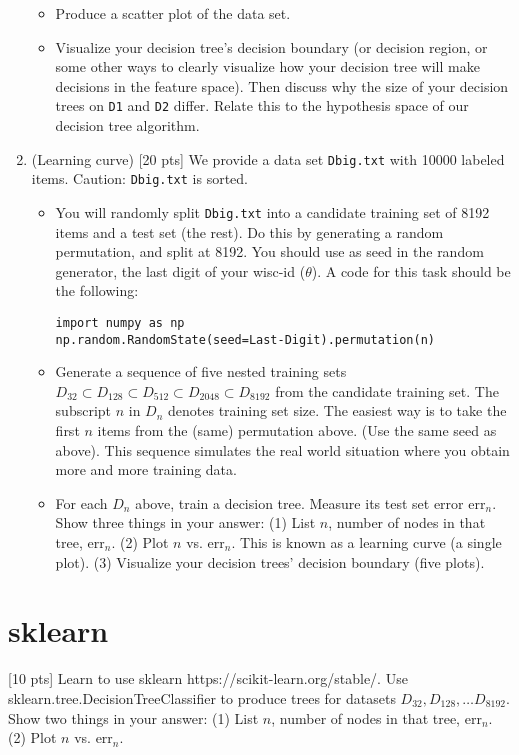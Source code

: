 \documentclass[a4paper]{article}
\theoremstyle{definition}
\newcommand{\1}{\Ind}
\begin{document}
\begin{enumerate}
\begin{itemize}
    \item 
 Produce a scatter plot of the data set. 
\item Visualize your decision tree's decision boundary (or decision region, or some other ways to clearly visualize how your decision tree will make decisions in the feature space). 
Then discuss why the size of your decision trees on {\tt D1} and {\tt D2} differ. Relate this to the hypothesis space of our decision tree algorithm. 
\end{itemize}
\item (Learning curve) [20 pts] We provide a data set {\tt Dbig.txt} with 10000 labeled items. Caution: {\tt Dbig.txt} is sorted. 
\begin{itemize}
    \item You will randomly split {\tt Dbig.txt} into a candidate training set of 8192 items and a test set (the rest). Do this by generating a random permutation, and split at 8192.
    You should use as seed in the random generator, the last digit of your wisc-id ($\theta$). A code for this task should be the following: 
\begin{verbatim}
import numpy as np
np.random.RandomState(seed=Last-Digit).permutation(n)
\end{verbatim}
\item Generate a sequence of five nested training sets $D_{32} \subset D_{128} \subset D_{512} \subset D_{2048} \subset D_{8192}$ from the candidate training set. The subscript $n$ in $D_n$ denotes training set size. The easiest way is to take the first $n$ items from the (same) permutation above. (Use the same seed as above).
This sequence simulates the real world situation where you obtain more and more training data. 
\item For each $D_n$ above, train a decision tree. Measure its test set error $\mathrm{err}_n$. Show three things in your answer: (1) List $n$, number of nodes in that tree,  $\mathrm{err}_n$. (2) Plot $n$ vs.  $\mathrm{err}_n$. This is known as a learning curve (a single plot). (3) Visualize your decision trees' decision boundary (five plots). 
\end{itemize}
\end{enumerate}
\section{sklearn}
[10 pts] Learn to use sklearn https://scikit-learn.org/stable/. Use sklearn.tree.DecisionTreeClassifier to produce trees for datasets $D_{32}, D_{128}, \ldots D_{8192}$. Show two things in your answer: (1) List $n$, number of nodes in that tree, $\mathrm{err}_n$. (2)  Plot $n$ vs.  $\mathrm{err}_n$. 
\end{document}
